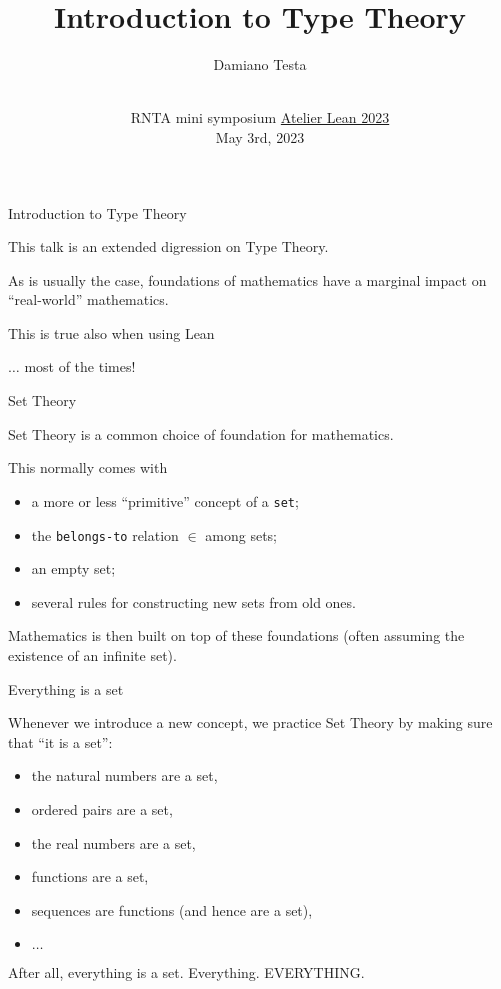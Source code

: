 \documentclass{beamer}
\title{Introduction to Type Theory}
\author{Damiano Testa}
\institute[]{University of Warwick}
\date[\href{http://www.rnta.eu/7MSRNTA/lean.html}{Atelier Lean 2023}]{\\
\vspace{50pt}
RNTA mini symposium
\href{http://www.rnta.eu/7MSRNTA/lean.html}{Atelier Lean 2023}\\
\vspace{20pt}
May 3rd, 2023
}
\begin{document}
\frame{\titlepage}

\begin{frame}[fragile]
{Introduction to Type Theory}

This talk is an extended digression on Type Theory.

As is usually the case, foundations of mathematics have a marginal impact on ``real-world'' mathematics.

This is true also when using Lean

$\ldots$ most of the times!
\end{frame}

\begin{frame}[fragile]{Set Theory}

Set Theory is a common choice of foundation for mathematics.

This normally comes with

\begin{itemize}
\setlength\itemsep{-2em}
\item
  a more or less ``primitive'' concept of a {\color{violet}\verb`set`};
\setlength\itemsep{-2em}
\item
  the {\color{violet}\verb`belongs-to`} relation $\in$ among sets;
\setlength\itemsep{-2em}
\item
  an empty set;
\setlength\itemsep{-2em}
\item
  several rules for constructing new sets from old ones.
\end{itemize}

Mathematics is then built on top of these foundations (often assuming the existence of an infinite set).
\end{frame}

\begin{frame}[fragile]{Everything is a set}

Whenever we introduce a new concept, we practice Set Theory by making sure that ``it is a set'':

\begin{itemize}
\setlength\itemsep{-2em}
\item
  the natural numbers are a set,
\setlength\itemsep{-2em}
\item
  ordered pairs are a set,
\setlength\itemsep{-2em}
\item
  the real numbers are a set,
\setlength\itemsep{-2em}
\item
  functions are a set,
\setlength\itemsep{-2em}
\item
  sequences are functions (and hence are a set),
\setlength\itemsep{-2em}
\item
  $\ldots$
\end{itemize}
\bigskip

After all, everything is a set. Everything. EVERYTHING.
\bigskip
\end{frame}
\end{document}
